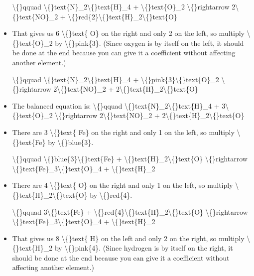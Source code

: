 \documentclass{article}
\begin{document}
\begin{itemize}
                    \textbackslash\{\}qquad
                        \textbackslash\{\}text\{N\}\_2\textbackslash\{\}text\{H\}\_4 + \textbackslash\{\}text\{O\}\_2 \textbackslash\{\}rightarrow 2\textbackslash\{\}text\{NO\}\_2 + \textbackslash\{\}red\{2\}\textbackslash\{\}text\{H\}\_2\textbackslash\{\}text\{O\}
  \item That gives us 6 \textbackslash\{\}text\{ O\} on the right and
                        only 2 on the left, so multiply
                        \textbackslash\{\}text\{O\}\_2 by \textbackslash\{\}pink\{3\}.
                        (Since oxygen is by itself on the left, it should be done
                        at the end because you can give it a coefficient without
                        affecting another element.)
                    
                    \textbackslash\{\}qquad
                        \textbackslash\{\}text\{N\}\_2\textbackslash\{\}text\{H\}\_4 + \textbackslash\{\}pink\{3\}\textbackslash\{\}text\{O\}\_2 \textbackslash\{\}rightarrow 2\textbackslash\{\}text\{NO\}\_2 + 2\textbackslash\{\}text\{H\}\_2\textbackslash\{\}text\{O\}
  \item The balanced equation is:
                    \textbackslash\{\}qquad
                        \textbackslash\{\}text\{N\}\_2\textbackslash\{\}text\{H\}\_4 + 3\textbackslash\{\}text\{O\}\_2 \textbackslash\{\}rightarrow 2\textbackslash\{\}text\{NO\}\_2 + 2\textbackslash\{\}text\{H\}\_2\textbackslash\{\}text\{O\}
  \item There are 3 \textbackslash\{\}text\{ Fe\} on the right and
                        only 1 on the left, so multiply
                        \textbackslash\{\}text\{Fe\} by \textbackslash\{\}blue\{3\}.
                    
                    \textbackslash\{\}qquad
                        \textbackslash\{\}blue\{3\}\textbackslash\{\}text\{Fe\} + \textbackslash\{\}text\{H\}\_2\textbackslash\{\}text\{O\} \textbackslash\{\}rightarrow \textbackslash\{\}text\{Fe\}\_3\textbackslash\{\}text\{O\}\_4 + \textbackslash\{\}text\{H\}\_2
  \item There are 4 \textbackslash\{\}text\{ O\} on the right and
                        only 1 on the left, so multiply
                        \textbackslash\{\}text\{H\}\_2\textbackslash\{\}text\{O\} by \textbackslash\{\}red\{4\}.
                    
                    \textbackslash\{\}qquad
                        3\textbackslash\{\}text\{Fe\} + \textbackslash\{\}red\{4\}\textbackslash\{\}text\{H\}\_2\textbackslash\{\}text\{O\} \textbackslash\{\}rightarrow \textbackslash\{\}text\{Fe\}\_3\textbackslash\{\}text\{O\}\_4 + \textbackslash\{\}text\{H\}\_2
  \item That gives us 8 \textbackslash\{\}text\{ H\} on the left and
                        only 2 on the right, so multiply
                        \textbackslash\{\}text\{H\}\_2 by \textbackslash\{\}pink\{4\}.
                        (Since hydrogen is by itself on the right, it should be done
                        at the end because you can give it a coefficient without
                        affecting another element.)
                    

\end{itemize}
\end{document}
